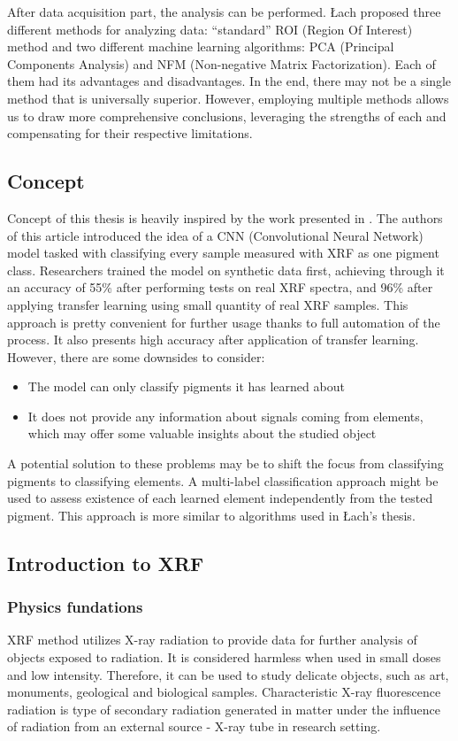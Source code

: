 After data acquisition part, the analysis can be performed. 
Łach proposed three different methods for analyzing data: ``standard'' ROI (Region Of Interest) method and two different machine learning algorithms: PCA (Principal Components Analysis) and NFM (Non-negative Matrix Factorization). 
Each of them had its advantages and disadvantages. 
In the end, there may not be a single method that is universally superior. 
However, employing multiple methods allows us to draw more comprehensive conclusions, leveraging the strengths of each and compensating for their respective limitations.

\subsection{Concept}
Concept of this thesis is heavily inspired by the work presented in \cite{Jones2022}. 
The authors of this article introduced the idea of a CNN (Convolutional Neural Network) model tasked with classifying every sample measured with XRF as one pigment class. 
Researchers trained the model on synthetic data first, achieving through it an accuracy of 55\% after performing tests on real XRF spectra, and 96\% after applying transfer learning using small quantity of real XRF samples.  
This approach is pretty convenient for further usage thanks to full automation of the process. 
It also presents high accuracy after application of transfer learning.
However, there are some downsides to consider:
\begin{itemize}
    \item The model can only classify pigments it has learned about
    \item It does not provide any information about signals coming from elements, which may offer some valuable insights about the studied object
\end{itemize}
A potential solution to these problems may be to shift the focus from classifying pigments to classifying elements. A multi-label classification approach might be used to assess existence of each learned element independently from the tested pigment. This approach is more similar to algorithms used in Łach's thesis.

\subsection{Introduction to XRF}
\subsubsection{Physics fundations}
XRF method utilizes X-ray radiation to provide data for further analysis of objects exposed to radiation. 
It is considered harmless when used in small doses and low intensity.  
Therefore, it can be used to study delicate objects, such as art, monuments, geological and biological samples.
Characteristic X-ray fluorescence radiation is type of secondary radiation generated in matter under the influence of radiation from an external source - X-ray tube in research setting.

